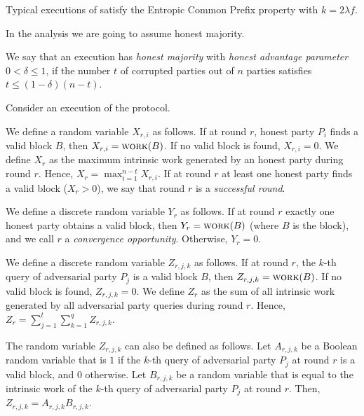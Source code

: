 \begin{conjecture}
  Typical executions of \poem satisfy the Entropic Common Prefix property
  with $k = 2 \lambda f$.
\end{conjecture}

In the analysis we are going to assume honest majority.

\begin{definition}
  We say that an execution has \emph{honest majority} with \emph{honest advantage parameter}
  $0 < \delta \leq 1$, if the number $t$ of corrupted parties out of
  $n$ parties satisfies $t \leq (1 - \delta) (n - t)$.
\end{definition}


Consider an execution of the \poem protocol.

We define a random variable $X_{r, i}$ as follows.
If at round $r$, honest party $P_i$ finds a valid block $B$, then $X_{r, i} = \textsc{work}(B)$.
If no valid block is found, $X_{r, i} = 0$. We define $X_{r}$ as the maximum intrinsic work
generated by an honest party during round $r$. Hence, $X_{r} = \max_{i = 1}^{n - t}{X_{r,i}}$.
If at round $r$ at least one honest party finds a valid block ($X_r > 0$),
we say that round $r$ is a \emph{successful round}.

We define a discrete random variable $Y_r$ as follows.
If at round $r$ exactly one honest party obtains a valid block, then $Y_r = \textsc{work}(B)$ (where $B$
is the block), and we call $r$ a \emph{convergence opportunity}.
Otherwise, $Y_r = 0$.

We define a discrete random variable $Z_{r, j, k}$ as follows.
If at round $r$, the $k$-th query of adversarial party $P_j$ is a valid block $B$, then
$Z_{r, j, k} = \textsc{work}(B)$. If no valid block is found, $Z_{r, j, k} = 0$.
We define $Z_{r}$ as the sum of all intrinsic work generated by all adversarial
party queries during round $r$. Hence, $Z_{r} = \sum_{j = 1}^{t}{ \sum_{k = 1}^{q}{ Z_{r, j, k} } }$.

The random variable $Z_{r, j, k}$ can also be defined as follows.
Let $A_{r,j,k}$ be a Boolean random variable that is $1$ if the $k$-th query of
adversarial party $P_j$ at round $r$ is a valid block, and $0$ otherwise.
Let $B_{r,j,k}$ be a random variable that is equal to the intrinsic work of the
$k$-th query of adversarial party $P_j$ at round $r$.
Then, $Z_{r, j, k} = A_{r,j,k} B_{r,j,k}$.

